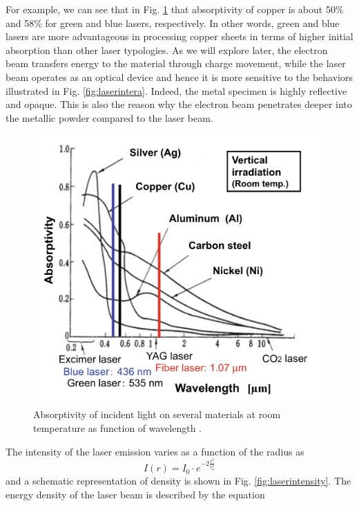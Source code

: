 For example, we can see that in Fig. \ref{fig:ondette} that absorptivity of copper is about 50\% and 58\% for green and blue lasers, respectively. In other words, green and blue lasers are more advantageous in processing copper sheets in terms of higher initial absorption than other laser typologies. As we will explore later, the electron beam transfers energy to the material through charge movement, while the laser beam operates as an optical device and hence it is more sensitive to the behaviors illustrated in Fig. \ref{fig:laserintera}. Indeed, the metal specimen is highly reflective and opaque. This is also the reason why the electron beam penetrates deeper into the metallic powder compared to the laser beam. 
\begin{figure}
    \centering
    \includegraphics[scale=0.4]{Images/ondette.png}
    \caption[Material absorptivity as function of wavelength.]{Absorptivity of incident light on several materials at room temperature as function of wavelength \cite{katayama_fundamentals_2020}.}
    \label{fig:ondette}
\end{figure}
The intensity of the laser emission varies as a function of the radius as 
\begin{equation}
    \label{eq:intensitylaser}
    I(r)=I_0\cdot e^{-2 \frac{r^2}{r_0^2}}
\end{equation}
and a schematic representation of density is shown in Fig. \ref{fig:laserintensity}.
The energy density of the laser beam is described by the equation
